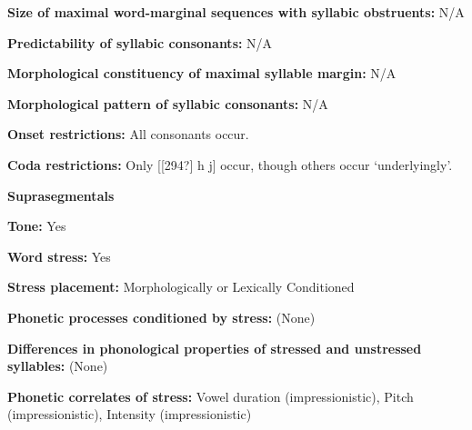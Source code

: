 \begin{styleBody}
\textbf{Size of maximal word{}-marginal sequences with syllabic obstruents:} N/A
\end{styleBody}

\begin{styleBody}
\textbf{Predictability of syllabic consonants:} N/A
\end{styleBody}

\begin{styleBody}
\textbf{Morphological constituency of maximal syllable margin:} N/A
\end{styleBody}

\begin{styleBody}
\textbf{Morphological pattern of syllabic consonants:} N/A
\end{styleBody}

\begin{styleBody}
\textbf{Onset restrictions:} All consonants occur.
\end{styleBody}

\begin{styleBody}
\textbf{Coda restrictions: }Only [[294?] h j] occur, though others occur ‘underlyingly’.
\end{styleBody}

\begin{styleBody}
\textbf{Suprasegmentals}
\end{styleBody}

\begin{styleBody}
\textbf{Tone:} Yes
\end{styleBody}

\begin{styleBody}
\textbf{Word stress:} Yes
\end{styleBody}

\begin{styleBody}
\textbf{Stress placement:} Morphologically or Lexically Conditioned
\end{styleBody}

\begin{styleBody}
\textbf{Phonetic processes conditioned by stress:} (None)
\end{styleBody}

\begin{styleBody}
\textbf{Differences in phonological properties of stressed and unstressed syllables:} (None)
\end{styleBody}

\begin{styleBody}
\textbf{Phonetic correlates of stress: }Vowel duration (impressionistic), Pitch (impressionistic), Intensity (impressionistic)
\end{styleBody}

